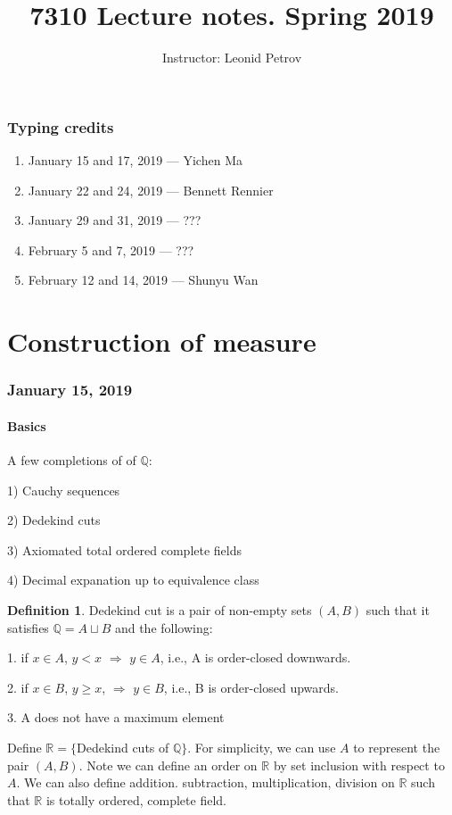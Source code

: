 \documentclass{article}
\title{7310 Lecture notes. Spring 2019}
\author{Instructor: Leonid Petrov}
\date{}
\theoremstyle{definition}
\newtheorem{definition}[theorem]{Definition}
\begin{document}
\maketitle

\section*{Typing credits}

\begin{enumerate}
	\item January 15 and 17, 2019 --- Yichen Ma
	\item January 22 and 24, 2019 --- Bennett Rennier
	\item January 29 and 31, 2019 --- ???
	\item February 5 and 7, 2019 --- ???
	\item February 12 and 14, 2019 --- Shunyu Wan
\end{enumerate}

\tableofcontents

\part{Construction of measure}

\section{January 15, 2019}

\subsection{Basics}

A few completions of of $\mathbb{Q}$:

1) Cauchy sequences

2) Dedekind cuts

3) Axiomated total ordered complete fields

4) Decimal expanation up to equivalence class


\begin{definition}
Dedekind cut is a pair of non-empty sets $(A,B)$ such that it satisfies $\mathbb{Q} = A \sqcup B$ and the following:

1. if $x \in A$, $y < x$ $\Longrightarrow$ $y \in A$, i.e., A is order-closed downwards.

2. if $x \in B$, $y \geq x$, $\Longrightarrow$ $y \in B$, i.e., B is order-closed upwards.

3. A does not have a maximum element
\end{definition}
Define $\mathbb{R} = \{$Dedekind cuts of $\mathbb{Q}\}$. For simplicity, we can use $A$ to represent the pair $(A,B)$. Note we can define an order on $\mathbb{R}$ by set inclusion with respect to $A$. We can also define addition. subtraction, multiplication, division on $\mathbb{R}$ such that $\mathbb{R}$ is totally ordered, complete field.
\end{document}
